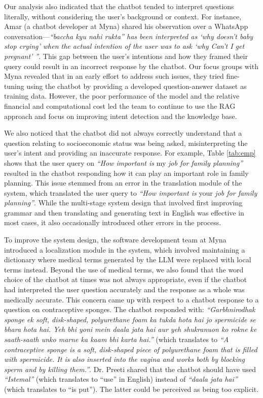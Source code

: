 Our analysis also indicated that the chatbot tended to interpret questions literally, without considering the user's background or context.
For instance, Amar (a chatbot developer at Myna) shared his observation over a WhatsApp conversation---\textit{``baccha kyu nahi rukta'' has been interpreted as `why doesn't baby stop crying' when the actual intention of the user was to ask `why Can't I get pregnant' ''}. This gap between the user's intentions and how they framed their query could result in an incorrect response by the chatbot. Our focus groups with Myna revealed that in an early effort to address such issues, they tried fine-tuning using the chatbot by providing a developed question-answer dataset as training data. However, the poor performance of the model and the relative financial and computational cost led the team to continue to use the RAG approach and focus on improving intent detection and the knowledge base.

We also noticed that the chatbot did not always correctly understand that a question relating to socioeconomic status was being asked, misinterpreting the user's intent and providing an inaccurate response. For example, Table \ref{tab:emp} shows that the user query on \textit{``How important is} my \textit{job for family planning''} resulted in the chatbot responding how it can play an important role in family planning. 
This issue stemmed from an error in the translation module of the system, which translated the user query to \textit{``How important is }your\textit{ job for family planning''}. 
While the multi-stage system design that involved first improving grammar and then translating and generating text in English was effective in most cases, it also occasionally introduced other errors in the process.

To improve the system design, the software development team at Myna introduced a localization module in the system, which involved maintaining a dictionary where medical terms generated by the LLM were replaced with local terms instead. 
Beyond the use of medical terms, we also found that the word choice of the chatbot at times was not always appropriate, even if the chatbot had interpreted the user question accurately and the response as a whole was medically accurate.
This concern came up with respect to a chatbot response to a question on contraceptive sponges. 
The chatbot responded with: {\textit{``Garbhnirodhak sponge ek soft, disk-shaped, polyurethane foam ka tukda hota hai jo spermicide se bhara hota hai. Yeh bhi yoni mein daala jata hai aur yeh shukranuon ko rokne ke saath-saath unko marne ka kaam bhi karta hai.''}} (which translates to \textit{``A contraceptive sponge is a soft, disk-shaped piece of polyurethane foam that is filled with spermicide. It is also inserted into the vagina and works both by blocking sperm and by killing them.''}. 
Dr. Preeti shared that the chatbot should have used \textit{``Istemal''} (which translates to ``use'' in English) instead of \textit{``daala jata hai''} (which translates to ``is put''). The latter could be perceived as being too explicit.

